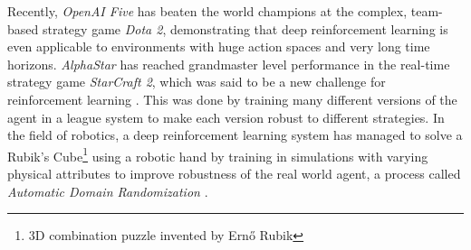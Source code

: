 Recently, \textit{OpenAI Five} \cite{openai-five} has beaten the world champions at the complex, team-based strategy game \textit{Dota 2}, demonstrating that deep reinforcement learning is even applicable to environments with huge action spaces and very long time horizons. \textit{AlphaStar} \cite{alphastar} has reached grandmaster level performance in the real-time strategy game \textit{StarCraft 2}, which was said to be a new challenge for reinforcement learning \cite{sc2ai}. This was done by training many different versions of the agent in a league system to make each version robust to different strategies. In the field of robotics, a deep reinforcement learning system has managed to solve a Rubik's Cube\footnote{3D combination puzzle invented by Ernő Rubik} using a robotic hand by training in simulations with varying physical attributes to improve robustness of the real world agent, a process called \textit{Automatic Domain Randomization} \cite{rubiks-cube}.